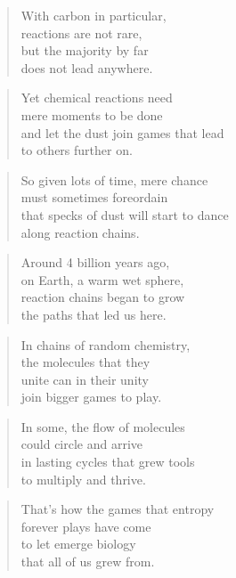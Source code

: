 \documentclass[10pt,a4paper]{article}
\begin{document}
\begin{paracol}{2}
\begin{verse}
With carbon in particular,\\
reactions are not rare,\\
but the majority by far\\
does not lead anywhere.
\end{verse}

\begin{verse}
Yet chemical reactions need\\
mere moments to be done\\
and let the dust join games that lead\\
to others further on.
\end{verse}

\begin{verse}
So given lots of time, mere chance\\
must sometimes foreordain\\
that specks of dust will start to dance\\
along reaction chains.
\end{verse}

\begin{verse}
Around 4 billion years ago,\\
on Earth, a warm wet sphere,\\
reaction chains began to grow\\
the paths that led us here.
\end{verse}

\begin{verse}
In chains of random chemistry,\\
the molecules that they\\
unite can in their unity\\
join bigger games to play.
\end{verse}

\begin{verse}
In some, the flow of molecules\\
could circle and arrive\\
in lasting cycles that grew tools\\
to multiply and thrive.
\end{verse}

\begin{verse}
That’s how the games that entropy\\
forever plays have come\\
to let emerge biology\\
that all of us grew from.
\end{verse}


\end{paracol}
\end{document}
